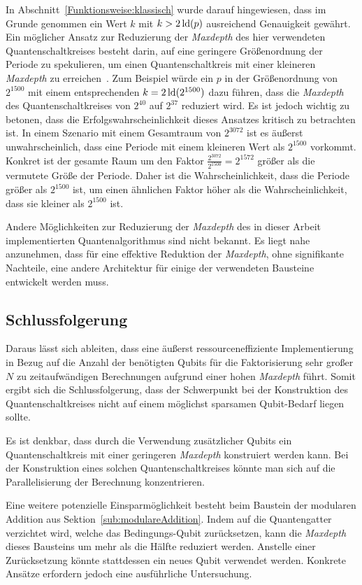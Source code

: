 In Abschnitt~\ref{Funktionsweise:klassisch} wurde darauf hingewiesen, 
dass im Grunde genommen ein Wert \(k\) mit \(k > 2\operatorname{ld}(p)\) ausreichend Genauigkeit gewährt.
Ein möglicher Ansatz zur Reduzierung der \textit{Maxdepth} des hier verwendeten Quantenschaltkreises besteht darin, 
auf eine geringere Größenordnung der Periode zu spekulieren, 
um einen Quantenschaltkreis mit einer kleineren \textit{Maxdepth} zu erreichen~\cite{Shor_1997}. 
Zum Beispiel würde ein \(p\) in der Größenordnung von \(2^{1500}\) mit einem entsprechenden \(k = 2\operatorname{ld}(2^{1500})\) dazu führen, 
dass die \textit{Maxdepth} des Quantenschaltkreises von \(2^{40}\) auf \(2^{37}\) reduziert wird. 
Es ist jedoch wichtig zu betonen, dass die Erfolgswahrscheinlichkeit dieses Ansatzes kritisch zu betrachten ist. 
In einem Szenario mit einem Gesamtraum von \(2^{3072}\) ist es äußerst unwahrscheinlich, 
dass eine Periode mit einem kleineren Wert als \(2^{1500}\) vorkommt.
Konkret ist der gesamte Raum um den Faktor \(\frac{2^{3072}}{2^{1500}} = 2^{1572}\) größer als die vermutete Größe der Periode. 
Daher ist die Wahrscheinlichkeit, dass die Periode größer als \(2^{1500}\) ist, 
um einen ähnlichen Faktor höher als die Wahrscheinlichkeit, 
dass sie kleiner als \(2^{1500}\) ist.

\bigskip

Andere Möglichkeiten zur Reduzierung der \textit{Maxdepth} des in dieser Arbeit implementierten Quantenalgorithmus sind nicht bekannt. 
Es liegt nahe anzunehmen, dass für eine effektive Reduktion der \textit{Maxdepth}, ohne signifikante Nachteile, 
eine andere Architektur für einige der verwendeten Bausteine entwickelt werden muss.

\subsection*{Schlussfolgerung}

Daraus lässt sich ableiten, 
dass eine äußerst ressourceneffiziente Implementierung in Bezug auf die Anzahl der benötigten Qubits für die Faktorisierung 
sehr großer \(N\) zu zeitaufwändigen Berechnungen aufgrund einer hohen \textit{Maxdepth} führt. 
Somit ergibt sich die Schlussfolgerung, 
dass der Schwerpunkt bei der Konstruktion des Quantenschaltkreises nicht auf einem möglichst sparsamen Qubit-Bedarf liegen sollte.

Es ist denkbar, dass durch die Verwendung zusätzlicher Qubits ein Quantenschaltkreis mit einer geringeren \textit{Maxdepth} konstruiert werden kann. 
Bei der Konstruktion eines solchen Quantenschaltkreises könnte man sich auf die Parallelisierung der Berechnung konzentrieren. 

Eine weitere potenzielle Einsparmöglichkeit besteht beim Baustein der modularen Addition aus Sektion~\ref{sub:modulareAddition}.
Indem auf die Quantengatter verzichtet wird, 
welche das Bedingungs-Qubit zurücksetzen, 
kann die \textit{Maxdepth} dieses Bausteins um mehr als die Hälfte reduziert werden. 
Anstelle einer Zurücksetzung könnte stattdessen ein neues Qubit verwendet werden. 
Konkrete Ansätze erfordern jedoch eine ausführliche Untersuchung.



